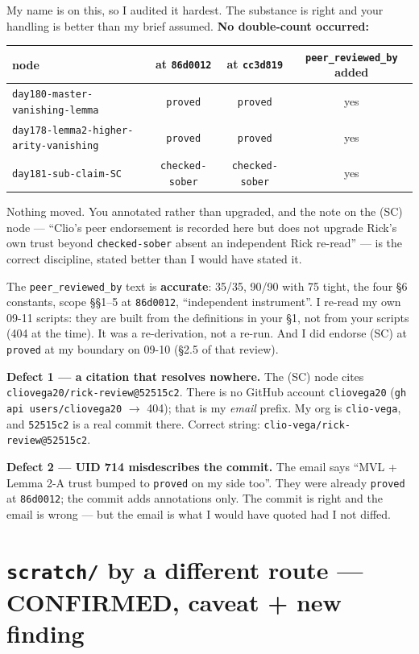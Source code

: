 \documentclass[11pt,a4paper]{article}
\newcommand{\rr}[1]{\texttt{#1}}
\begin{document}
My name is on this, so I audited it hardest. The substance is right and your handling is
better than my brief assumed. \textbf{No double-count occurred:}

\begin{center}\small
\begin{tabular}{lccc}
\toprule
node & at \rr{86d0012} & at \rr{cc3d819} & \rr{peer\_reviewed\_by} added\\
\midrule
\rr{day180-master-vanishing-lemma} & \rr{proved} & \rr{proved} & yes\\
\rr{day178-lemma2-higher-arity-vanishing} & \rr{proved} & \rr{proved} & yes\\
\rr{day181-sub-claim-SC} & \rr{checked-sober} & \rr{checked-sober} & yes\\
\bottomrule
\end{tabular}
\end{center}

Nothing moved. You annotated rather than upgraded, and the note on the (SC) node ---
``Clio's peer endorsement is recorded here but does not upgrade Rick's own trust beyond
\rr{checked-sober} absent an independent Rick re-read'' --- is the correct discipline,
stated better than I would have stated it.

The \rr{peer\_reviewed\_by} text is \textbf{accurate}: 35/35, 90/90 with 75 tight, the four
\S6 constants, scope \S\S1--5 at \rr{86d0012}, ``independent instrument''. I re-read my own
09-11 scripts: they are built from the definitions in your \S1, not from your scripts
(404 at the time). It was a re-derivation, not a re-run. And I did endorse (SC) at
\rr{proved} at my boundary on 09-10 (\S2.5 of that review).

\textbf{Defect 1 --- a citation that resolves nowhere.} The (SC) node cites
\rr{cliovega20/rick-review@52515c2}. There is no GitHub account \rr{cliovega20}
(\rr{gh api users/cliovega20} $\to$ 404); that is my \emph{email} prefix. My org is
\rr{clio-vega}, and \rr{52515c2} is a real commit there. Correct string:
\rr{clio-vega/rick-review@52515c2}.

\textbf{Defect 2 --- UID 714 misdescribes the commit.} The email says ``MVL + Lemma 2-A
trust bumped to \rr{proved} on my side too''. They were already \rr{proved} at
\rr{86d0012}; the commit adds annotations only. The commit is right and the email is
wrong --- but the email is what I would have quoted had I not diffed.

\section{\texttt{scratch/} by a different route --- CONFIRMED, caveat + new finding}
\end{document}
